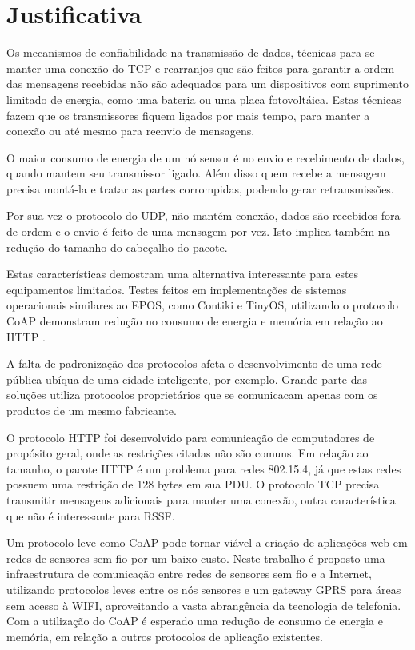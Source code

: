 \section{Justificativa}

Os mecanismos de confiabilidade na transmiss\~ao de dados, t\'ecnicas para se manter uma conex\~ao do TCP e rearranjos que s\~ao feitos para garantir a ordem das mensagens recebidas n\~ao s\~ao adequados para um dispositivos com suprimento limitado de energia, como uma bateria ou uma placa fotovolt\'aica. Estas t\'ecnicas fazem que os transmissores fiquem ligados por mais tempo, para manter a conex\~ao ou at\'e mesmo para reenvio de mensagens.

O maior consumo de energia de um n\'o sensor \'e no envio e recebimento de dados, quando mantem seu transmissor ligado. Al\'em disso quem recebe a mensagem precisa mont\'a-la e tratar as partes corrompidas, podendo gerar retransmiss\~oes.

Por sua vez o protocolo do UDP, n\~ao mant\'em conex\~ao, dados s\~ao recebidos fora de ordem e o envio \'e feito de uma mensagem por vez. Isto implica tamb\'em na redu\c{c}\~ao do tamanho do cabe\c{c}alho do pacote.

Estas caracter\'isticas demostram uma alternativa interessante para estes equipamentos limitados. Testes feitos em implementa\c{c}\~oes de sistemas operacionais similares ao EPOS, como Contiki e TinyOS, utilizando o protocolo CoAP demonstram redu\c{c}\~ao no consumo de energia e mem\'oria em rela\c{c}\~ao ao HTTP \cite{kuladinithi2011implementation}.

A falta de padroniza\c{c}\~ao dos protocolos afeta o desenvolvimento de uma rede p\'ublica ub\'iqua de uma cidade inteligente, por exemplo. Grande parte das solu\c{c}\~oes utiliza protocolos propriet\'arios que se comunicacam apenas com os produtos de um mesmo fabricante.

O protocolo HTTP foi desenvolvido para comunica\c{c}\~ao de computadores de prop\'osito geral, onde as restri\c{c}\~oes citadas n\~ao s\~ao comuns. Em rela\c{c}\~ao ao tamanho, o pacote HTTP \'e um problema para redes 802.15.4, j\'a que estas redes possuem uma restri\c{c}\~ao de 128 bytes em sua PDU. O protocolo TCP precisa transmitir mensagens adicionais para manter uma conex\~ao, outra caracter\'istica que n\~ao \'e interessante para RSSF.

Um protocolo leve como CoAP pode tornar vi\'avel a cria\c{c}\~ao de aplica\-\c{c}\~oes web em redes de sensores sem fio por um baixo custo. Neste trabalho \'e proposto uma infraestrutura de comunica\c{c}\~ao entre redes de sensores sem fio e a Internet, utilizando protocolos leves entre os n\'os sensores e um gateway GPRS para \'areas sem acesso \`a WIFI, aproveitando a vasta abrang\^encia da tecnologia de telefonia. Com a utiliza\c{c}\~ao do CoAP \'e esperado uma redu\c{c}\~ao de consumo de energia e mem\'oria, em rela\c{c}\~ao a outros protocolos de aplica\c{c}\~ao existentes.

